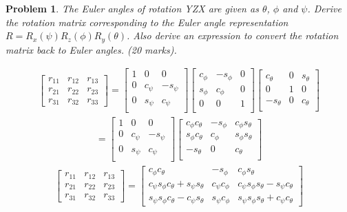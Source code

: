 \documentclass{article}
\newtheorem{prob}{Problem}
\begin{document}
\begin{prob}
  The Euler angles of rotation YZX are given as $\theta$, $\phi$ and $\psi$.
  Derive the rotation matrix corresponding to the Euler angle representation $R = R_x(\psi) R_z(\phi) R_y(\theta)$. Also derive an expression to convert the rotation matrix back to Euler angles. (20 marks).
\end{prob}
\begin{align}
  \begin{bmatrix}
    r_{11} & r_{12} & r_{13}  \\
    r_{21} & r_{22} & r_{23}  \\
    r_{31} & r_{32} & r_{33}  
  \end{bmatrix}
  =
  \begin{bmatrix}
    1 & 0 & 0\\
    0 & c_\psi & -s_\psi \\
    0 & s_\psi & c_\psi \\
  \end{bmatrix}
  \begin{bmatrix}
    c_\phi & -s_\phi & 0 \\
    s_\phi & c_\phi & 0 \\
    0 & 0 & 1\\
  \end{bmatrix}
  \begin{bmatrix}
    c_\theta & 0 & s_\theta \\
    0 & 1 & 0\\
    -s_\theta & 0 & c_\theta \\
  \end{bmatrix}
\end{align}
\begin{align}
  = \begin{bmatrix}
    1 & 0 & 0\\
    0 & c_\psi & -s_\psi \\
    0 & s_\psi & c_\psi \\
  \end{bmatrix}
  \begin{bmatrix}
    c_\phi c_\theta & - s_\phi & c_\phi s_\theta \\
    s_\phi c_\theta &   c_\phi & s_\phi s_\theta \\
    -s_\theta & 0 & c_\theta \\
  \end{bmatrix}
\end{align}
\begin{align}
  \begin{bmatrix}
    r_{11} & r_{12} & r_{13}  \\
    r_{21} & r_{22} & r_{23}  \\
    r_{31} & r_{32} & r_{33}  
  \end{bmatrix}
  = \begin{bmatrix}
    c_\phi c_\theta & - s_\phi & c_\phi s_\theta \\
    c_\psi s_\phi c_\theta + s_\psi s_\theta &  c_\psi c_\phi & c_\psi s_\phi s_\theta  - s_\psi c_\theta \\
    s_\psi s_\phi c_\theta - c_\psi s_\theta & s_\psi c_\phi & s_\psi s_\phi s_\theta + c_\psi c_\theta
  \end{bmatrix}
\end{align}
\end{document}
